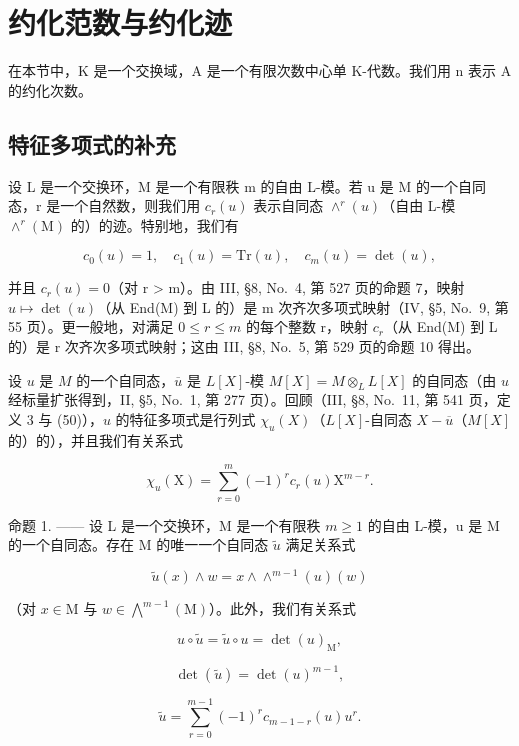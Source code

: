 \section{约化范数与约化迹}

在本节中，K 是一个交换域，A 是一个有限次数中心单 K-代数。我们用 n 表示 A 的约化次数。

\subsection{特征多项式的补充}

设 L 是一个交换环，M 是一个有限秩 m 的自由 L-模。若 u 是 M 的一个自同态，r 是一个自然数，则我们用 \(c_{r}(u)\) 表示自同态 \(\wedge^{r}(u)\)（自由 L-模 \(\wedge^{r}(\mathrm{M})\) 的）的迹。特别地，我们有

\[
c _ {0} (u) = 1, \quad c _ {1} (u) = \mathrm{Tr} (u), \quad c _ {m} (u) = \det (u),\tag{1}
\]

并且 \(c_{r}(u) = 0\)（对 r \textgreater{} m）。由 III, §8, No.~4, 第 527 页的命题 7，映射 \(u \mapsto \det(u)\)（从 End(M) 到 L 的）是 m 次齐次多项式映射（IV, §5, No.~9, 第 55 页）。更一般地，对满足 \(0 \leqslant r \leqslant m\) 的每个整数 r，映射 \(c_{r}\)（从 End(M) 到 L 的）是 r 次齐次多项式映射；这由 III, §8, No.~5, 第 529 页的命题 10 得出。

设 \(u\) 是 \(M\) 的一个自同态，\(\overline{u}\) 是 \(L[X]\)-模 \(M[X] = M \otimes_{L} L[X]\) 的自同态（由 \(u\) 经标量扩张得到，II, §5, No.~1, 第 277 页）。回顾（III, §8, No.~11, 第 541 页，定义 3 与 (50)），\(u\) 的特征多项式是行列式 \(\chi_u(X)\)（\(L[X]\)-自同态 \(X - \overline{u}\)（\(M[X]\) 的）的），并且我们有关系式

\[
\chi_ {u} (\mathrm{X}) = \sum_ {r = 0} ^ {m} (- 1) ^ {r} c _ {r} (u) \mathrm{X} ^ {m - r}.\tag{2}
\]

命题 1. —— 设 L 是一个交换环，M 是一个有限秩 \(m \geqslant 1\) 的自由 L-模，u 是 M 的一个自同态。存在 M 的唯一一个自同态 \(\widetilde{u}\) 满足关系式

\[
\widetilde {u} (x) \wedge w = x \wedge \wedge^ {m - 1} (u) (w)\tag{3}
\]

（对 \(x\in \mathrm{M}\) 与 \(w\in \bigwedge^{m - 1}(\mathrm{M})\)）。此外，我们有关系式

\[
u \circ \widetilde {u} = \widetilde {u} \circ u = \det (u) _ {\mathrm{M}},\tag{4}
\]

\[
\det (\widetilde {u}) = \det (u) ^ {m - 1},\tag{5}
\]

\[
\widetilde {u} = \sum_ {r = 0} ^ {m - 1} (- 1) ^ {r} c _ {m - 1 - r} (u) u ^ {r}.\tag{6}
\]

